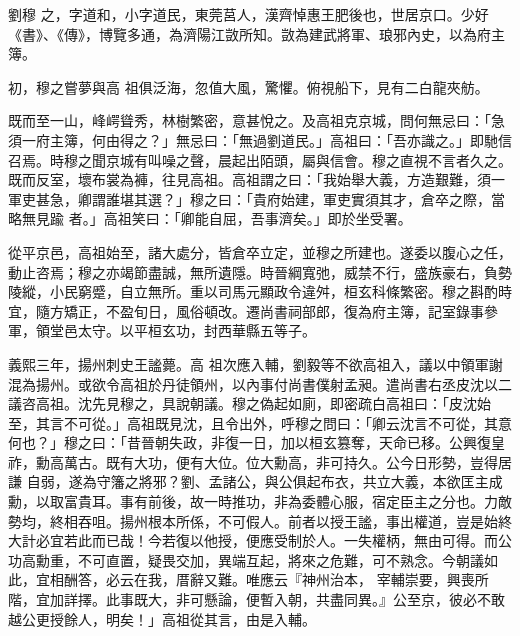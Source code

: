 
\begin{pinyinscope}

 劉穆
 之，字道和，小字道民，東莞莒人，漢齊悼惠王肥後也，世居京口。少好《書》、《傳》，博覽多通，為濟陽江敳所知。敳為建武將軍、琅邪內史，以為府主簿。



 初，穆之嘗夢與高
 祖俱泛海，忽值大風，驚懼。俯視船下，見有二白龍夾舫。



 既而至一山，峰崿聳秀，林樹繁密，意甚悅之。及高祖克京城，問何無忌曰：「急須一府主簿，何由得之？」無忌曰：「無過劉道民。」高祖曰：「吾亦識之。」即馳信召焉。時穆之聞京城有叫噪之聲，晨起出陌頭，屬與信會。穆之直視不言者久之。既而反室，壞布裳為褲，往見高祖。高祖謂之曰：「我始舉大義，方造艱難，須一軍吏甚急，卿謂誰堪其選？」穆之曰：「貴府始建，軍吏實須其才，倉卒之際，當略無見踰
 者。」高祖笑曰：「卿能自屈，吾事濟矣。」即於坐受署。



 從平京邑，高祖始至，諸大處分，皆倉卒立定，並穆之所建也。遂委以腹心之任，動止咨焉；穆之亦竭節盡誠，無所遺隱。時晉綱寬弛，威禁不行，盛族豪右，負勢陵縱，小民窮蹙，自立無所。重以司馬元顯政令違舛，桓玄科條繁密。穆之斟酌時宜，隨方矯正，不盈旬日，風俗頓改。遷尚書祠部郎，復為府主簿，記室錄事參軍，領堂邑太守。以平桓玄功，封西華縣五等子。



 義熙三年，揚州刺史王謐薨。高
 祖次應入輔，劉毅等不欲高祖入，議以中領軍謝混為揚州。或欲令高祖於丹徒領州，以內事付尚書僕射孟昶。遣尚書右丞皮沈以二議咨高祖。沈先見穆之，具說朝議。穆之偽起如廁，即密疏白高祖曰：「皮沈始至，其言不可從。」高祖既見沈，且令出外，呼穆之問曰：「卿云沈言不可從，其意何也？」穆之曰：「昔晉朝失政，非復一日，加以桓玄篡奪，天命已移。公興復皇祚，勳高萬古。既有大功，便有大位。位大勳高，非可持久。公今日形勢，豈得居謙
 自弱，遂為守籓之將邪？劉、孟諸公，與公俱起布衣，共立大義，本欲匡主成勳，以取富貴耳。事有前後，故一時推功，非為委體心服，宿定臣主之分也。力敵勢均，終相吞咀。揚州根本所係，不可假人。前者以授王謐，事出權道，豈是始終大計必宜若此而已哉！今若復以他授，便應受制於人。一失權柄，無由可得。而公功高勳重，不可直置，疑畏交加，異端互起，將來之危難，可不熟念。今朝議如此，宜相酬答，必云在我，厝辭又難。唯應云『神州治本，
 宰輔崇要，興喪所階，宜加詳擇。此事既大，非可懸論，便暫入朝，共盡同異。』公至京，彼必不敢越公更授餘人，明矣！」高祖從其言，由是入輔。




\end{pinyinscope}
